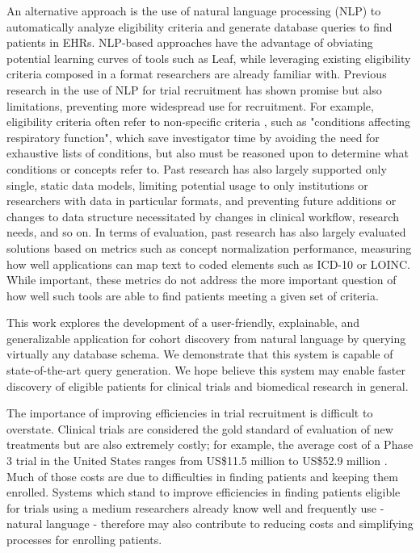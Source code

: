 \documentclass[../main.tex]{subfiles}
\begin{document}
An alternative approach is the use of natural language processing (NLP) to automatically analyze eligibility criteria and generate database queries to find patients in EHRs. NLP-based approaches have the advantage of obviating potential learning curves of tools such as Leaf, while leveraging existing eligibility criteria composed in a format researchers are already familiar with. Previous research in the use of NLP for trial recruitment \cite{yuan2019criteria2query, soni2020patient, fang2022combining, zhang2020deepenroll, chen2019clinical, patrao2015recruit, dhayne2021emr2vec, liu2021evaluating, xiong2019cohort} has shown promise but also limitations, preventing more widespread use for recruitment. For example, eligibility criteria often refer to non-specific criteria \cite{wang2017classifying, ross2010analysis}, such as "conditions affecting respiratory function", which save investigator time by avoiding the need for exhaustive lists of conditions, but also must be reasoned upon to determine what conditions or concepts refer to. Past research has also largely supported only single, static data models, limiting potential usage to only institutions or researchers with data in particular formats, and preventing future additions or changes to data structure necessitated by changes in clinical workflow, research needs, and so on. In terms of evaluation, past research has also largely evaluated solutions based on metrics such as concept normalization performance, measuring how well applications can map text to coded elements such as ICD-10 or LOINC. While important, these metrics do not address the more important question of how well such tools are able to find patients meeting a given set of criteria.

This work explores the development of a user-friendly, explainable, and generalizable application for cohort discovery from natural language by querying virtually any database schema. We demonstrate that this system is capable of state-of-the-art query generation. We hope believe this system may enable faster discovery of eligible patients for clinical trials and biomedical research in general.

The importance of improving efficiencies in trial recruitment is difficult to overstate. Clinical trials are considered the gold standard of evaluation of new treatments but are also extremely costly; for example, the average cost of a Phase 3 trial in the United States ranges from US\$11.5 million to US\$52.9 million \cite{sertkaya2016key}. Much of those costs are due to difficulties in finding patients and keeping them enrolled. Systems which stand to improve efficiencies in finding patients eligible for trials using a medium researchers already know well and frequently use - natural language - therefore may also contribute to reducing costs and simplifying processes for enrolling patients. 
\end{document}

